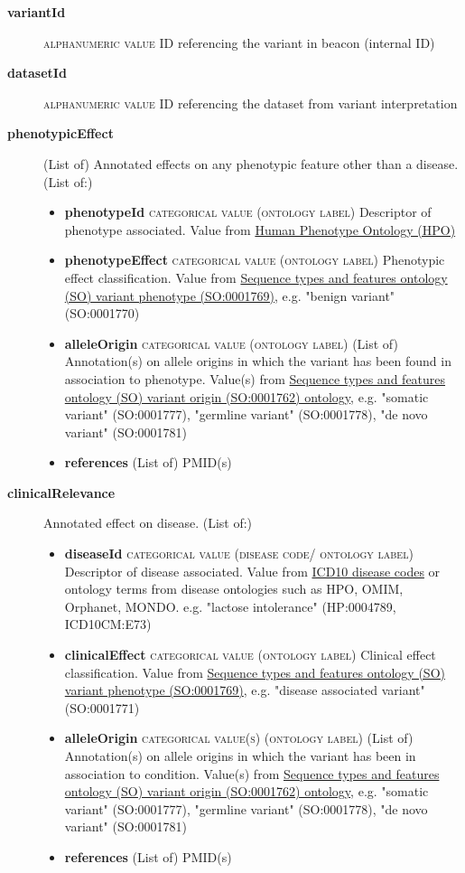 \documentclass[a4paper, 10pt]{article}        %
\begin{document}
  \begin{description}
  	\item[\textbf{variantId}] {\textsc{alphanumeric value}} ID referencing the variant in beacon (internal ID)
	\item[\textbf{datasetId}] {\textsc{alphanumeric value}} ID referencing the dataset from variant interpretation
	\item[\textbf{phenotypicEffect}] (List of) Annotated effects on any phenotypic feature other than a disease. (List of:)
	\begin{itemize}
				\item[] \textbf{phenotypeId} {\textsc{categorical value (ontology label)}} Descriptor of phenotype associated. Value from \href{http:purl.obolibrary.org/obo/HP_0000001}{Human Phenotype Ontology (HPO)}
				\item[] \textbf{phenotypeEffect} {\textsc{categorical value (ontology label)}} Phenotypic effect classification. Value from \href{http://purl/obolibrary.org/obo/SO_0001769}{Sequence types and features ontology (SO) variant phenotype (SO:0001769)}, e.g. "benign variant" (SO:0001770)
				\item[] \textbf{alleleOrigin} {\textsc{categorical value (ontology label)}} (List of) Annotation(s) on allele origins in which the variant has been found in association to phenotype. Value(s) from \href{http://purl.obolibrary.org/obo/SO_0001762}{Sequence types and features ontology (SO) variant origin (SO:0001762) ontology}, e.g. "somatic variant" (SO:0001777), "germline variant" (SO:0001778), "de novo variant" (SO:0001781)
				\item[] \textbf{references} (List of) PMID(s)
	\end{itemize} 
	\item[\textbf{clinicalRelevance}] Annotated effect on disease. (List of:)
			\begin{itemize}
				\item[] \textbf{diseaseId} {\textsc{categorical value (disease code/ ontology label)}} Descriptor of disease associated. Value from \href{https://www.who.int/classifications/icd/en/}{ICD10 disease codes} or ontology terms from disease ontologies such as HPO, OMIM, Orphanet, MONDO. e.g. "lactose intolerance" (HP:0004789, ICD10CM:E73)
				\item[] \textbf{clinicalEffect} {\textsc{categorical value (ontology label)}} Clinical effect classification. Value from \href{http://purl/obolibrary.org/obo/SO_0001769}{Sequence types and features ontology (SO) variant phenotype (SO:0001769)}, e.g. "disease associated variant" (SO:0001771)
				\item[] \textbf{alleleOrigin} {\textsc{categorical value(s) (ontology label)}} (List of) Annotation(s) on allele origins in which the variant has been in association to condition. Value(s) from \href{http://purl.obolibrary.org/obo/SO_0001762}{Sequence types and features ontology (SO) variant origin (SO:0001762) ontology}, e.g. "somatic variant" (SO:0001777), "germline variant" (SO:0001778), "de novo variant" (SO:0001781)
				\item[] \textbf{references} (List of) PMID(s)
		 \end{itemize} 


\end{description}
\end{document}

